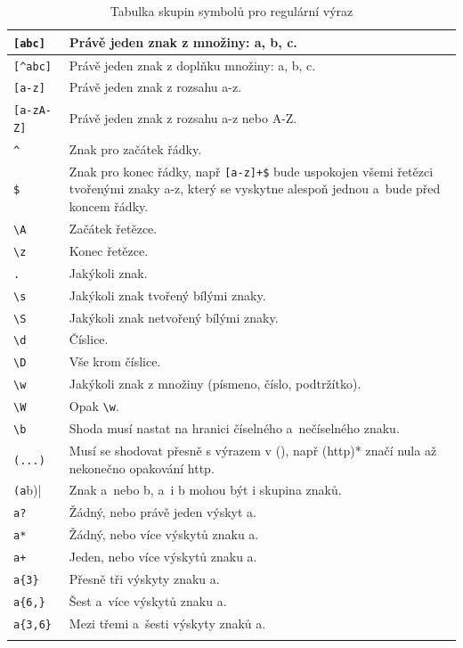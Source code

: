 \begin{center}
\begin{longtable}{| m{} | m{} |}
\hline
\verb|[abc]| & Právě jeden znak z množiny: a, b, c. \\
\hline
\verb|[^abc]| & Právě jeden znak z doplňku množiny: a, b, c. \\
\hline
\verb|[a-z]| & Právě jeden znak z rozsahu a-z. \\
\hline
\verb|[a-zA-Z]| & Právě jeden znak z rozsahu a-z nebo A-Z. \\
\hline
\verb|^| & Znak pro začátek řádky. \\
\hline
\verb|$| & Znak pro konec řádky, např \verb|[a-z]+$| bude uspokojen všemi řetězci tvořenými znaky a-z, který se vyskytne alespoň jednou a~bude před koncem řádky. \\
\hline
\verb|\A| & Začátek řetězce. \\
\hline
\verb|\z| & Konec řetězce. \\
\hline
\verb|.| & Jakýkoli znak. \\
\hline
\verb|\s| & Jakýkoli znak tvořený bílými znaky. \\
\hline
\verb|\S| & Jakýkoli znak netvořený bílými znaky. \\
\hline
\verb|\d| & Číslice. \\
\hline
\verb|\D| & Vše krom číslice. \\
\hline
\verb|\w| & Jakýkoli znak z množiny (písmeno, číslo, podtržítko). \\
\hline
\verb|\W| & Opak \verb|\w|. \\
\hline
\verb|\b| & Shoda musí nastat na hranici číselného a~nečíselného znaku. \\
\hline
\verb|(...)| & Musí se shodovat přesně s výrazem v (), např (http)* značí nula až nekonečno opakování http. \\
\hline
\verb|(a|b)| & Znak a~nebo b, a~i b mohou být i skupina znaků. \\
\hline
\verb|a?| & Žádný, nebo právě jeden výskyt a. \\
\hline
\verb|a*| & Žádný, nebo více výskytů znaku a. \\
\hline
\verb|a+| & Jeden, nebo více výskytů znaku a. \\
\hline
\verb|a{3}| & Přesně tři výskyty znaku a. \\
\hline
\verb|a{6,}| & Šest a~více výskytů znaku a. \\
\hline
\verb|a{3,6}| & Mezi třemi a~šesti výskyty znaků a. \\
\hline
\caption[Tabulka skupin symbolů pro regulární výraz]{Tabulka skupin symbolů pro regulární výraz}\label{tab:regexpr}
\end{longtable}
\end{center}

